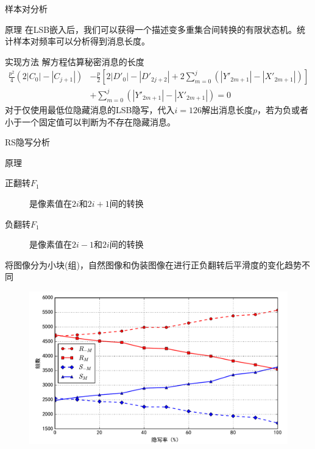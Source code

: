 \documentclass[14pt]{Bredelebeamer}
\begin{document}
\begin{frame}{样本对分析}
  \begin{exampleblock}{原理}
    在LSB嵌入后，我们可以获得一个描述变多重集合间转换的有限状态机。统计样本对频率可以分析得到消息长度。
  \end{exampleblock}

  \begin{block}{实现方法}
    解方程估算秘密消息的长度
    $$\begin{aligned}
    \frac{{{p^2}}}{4}\left( {2\left| {{C_0}} \right| - \left| {{C_{j + 1}}} \right|} \right) &- \frac{p}{2}\left[ {2\left| {D{'_0}} \right| - \left| {D{'_{2j + 2}}} \right| + 2\sum\limits_{m = 0}^j {\left( {\left| {Y{'_{2m + 1}}} \right| - \left| {X{'_{2m + 1}}} \right|} \right)} } \right] \\
    &+ \sum\limits_{m = 0}^j {\left( {\left| {Y{'_{2m + 1}}} \right| - \left| {X{'_{2m + 1}}} \right|} \right)}  = 0
    \end{aligned}$$
    对于仅使用最低位隐藏消息的LSB隐写，代入$i=126$解出消息长度$p$，若为负或者小于一个固定值可以判断为不存在隐藏消息。
  \end{block}
\end{frame}

\begin{frame}{RS隐写分析}
  \begin{exampleblock}{原理}
  \begin{description}
    \item[正翻转$F_1$]是像素值在$2i$和$2i+1$间的转换
    \item[负翻转$F_1$]是像素值在$2i-1$和$2i$间的转换
  \end{description}
  将图像分为小块(组)，自然图像和伪装图像在进行正负翻转后平滑度的变化趋势不同
  \end{exampleblock}
  \begin{figure}
    \centering
    \includegraphics[width=.75\textwidth]{images/rsdemo}
  \end{figure}
\end{frame}
\end{document}

